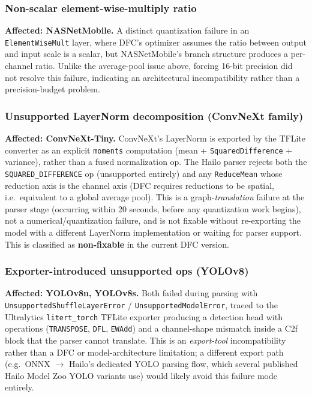 \documentclass[11pt]{article}
\begin{document}
\subsubsection{Non-scalar element-wise-multiply ratio}
\textbf{Affected: NASNetMobile.} A distinct quantization failure in an
\texttt{ElementWiseMult} layer, where DFC's optimizer assumes the ratio
between output and input scale is a scalar, but NASNetMobile's branch
structure produces a per-channel ratio. Unlike the average-pool issue above,
forcing 16-bit precision did not resolve this failure, indicating an
architectural incompatibility rather than a precision-budget problem.

\subsubsection{Unsupported LayerNorm decomposition (ConvNeXt family)}
\textbf{Affected: ConvNeXt-Tiny.} ConvNeXt's LayerNorm is exported by the
TFLite converter as an explicit \texttt{moments} computation (mean +
\texttt{SquaredDifference} + variance), rather than a fused normalization op.
The Hailo parser rejects both the \texttt{SQUARED\_DIFFERENCE} op (unsupported
entirely) and any \texttt{ReduceMean} whose reduction axis is the channel axis
(DFC requires reductions to be spatial, i.e.\ equivalent to a global average
pool). This is a graph-\emph{translation} failure at the parser stage
(occurring within 20 seconds, before any quantization work begins), not a
numerical/quantization failure, and is not fixable without re-exporting the
model with a different LayerNorm implementation or waiting for parser support.
This is classified as \textbf{non-fixable} in the current DFC version.

\subsubsection{Exporter-introduced unsupported ops (YOLOv8)}
\textbf{Affected: YOLOv8n, YOLOv8s.} Both failed during parsing with
\texttt{UnsupportedShuffleLayerError} / \texttt{UnsupportedModelError},
traced to the Ultralytics \texttt{litert\_torch} TFLite exporter producing a
detection head with operations (\texttt{TRANSPOSE}, \texttt{DFL}, \texttt{EWAdd})
and a channel-shape mismatch inside a C2f block that the parser cannot
translate. This is an \emph{export-tool} incompatibility rather than a DFC or
model-architecture limitation; a different export path (e.g.\ ONNX
$\rightarrow$ Hailo's dedicated YOLO parsing flow, which several published
Hailo Model Zoo YOLO variants use) would likely avoid this failure mode
entirely.
\end{document}
